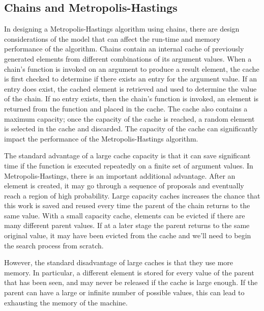 \subsection{Chains and Metropolis-Hastings}

In designing a Metropolis-Hastings algorithm using chains, there are design considerations of the model that can affect the run-time and memory performance of the algorithm. Chains contain an internal cache of previously generated elements from different combinations of its argument values. When a chain's function is invoked on an argument to produce a result element, the cache is first checked to determine if there exists an entry for the argument value. If an entry does exist, the cached element is retrieved and used to determine the value of the chain. If no entry exists, then the chain's function is invoked, an element is returned from the function and placed in the cache. The cache also contains a maximum capacity; once the capacity of the cache is reached, a random element is selected in the cache and discarded. The capacity of the cache can significantly impact the performance of the Metropolis-Hastings algorithm. 

The standard advantage of a large cache capacity is that it can save significant time if the function is executed repeatedly on a finite set of argument values. In Metropolis-Hastings, there is an important additional advantage. After an element is created, it may go through a sequence of proposals and eventually reach a region of high probability. Large capacity caches increases the chance that this work is saved and reused every time the parent of the chain returns to the same value. With a small capacity
cache, elements can be evicted if there are many different parent values. If at a later stage the parent returns to the same original value, it may have been evicted from the cache and we'll need to begin the
search process from scratch.

However, the standard disadvantage of large caches is that they use more memory. In particular, a different element is stored for every value of the parent that has been seen, and may never be released if the cache is large enough. If the parent can have a large or infinite number of possible values, this can lead to exhausting the memory of the machine.

